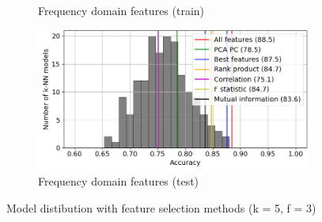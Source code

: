 \begin{figure}[h]
\begin{subfigure}[b]{0.48\textwidth}
        \caption{Frequency domain features (train)}
    \end{subfigure}
    \hfill
    \begin{subfigure}[b]{0.48\textwidth}
        \includegraphics[width=\textwidth]{assets/results/feature-combinations/model-distr-fsel-k5-f3-FD-test.png}
        \caption{Frequency domain features (test)}
    \end{subfigure}
    \caption{Model distibution with feature selection methods (k = 5, f = 3)}
\end{figure}




